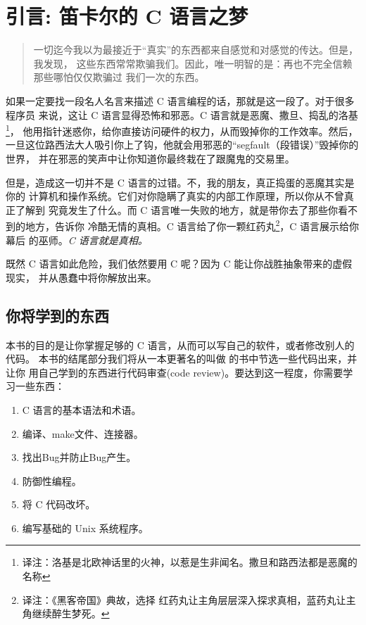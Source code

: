 \chapter*{引言: 笛卡尔的 C 语言之梦}

\begin{quotation}

一切迄今我以为最接近于“真实”的东西都来自感觉和对感觉的传达。但是，我发现，
这些东西常常欺骗我们。因此，唯一明智的是：再也不完全信赖那些哪怕仅仅欺骗过
我们一次的东西。

\end{quotation}

如果一定要找一段名人名言来描述 C 语言编程的话，那就是这一段了。对于很多程序员
来说，这让 C 语言显得恐怖和邪恶。C 语言就是恶魔、撒旦、捣乱的洛基\footnote{译注：洛基是北欧神话里的火神，以惹是生非闻名。撒旦和路西法都是恶魔的名称}，
他用指针迷惑你，给你直接访问硬件的权力，从而毁掉你的工作效率。然后，
一旦这位路西法大人吸引你上了钩，他就会用邪恶的“segfault（段错误）”毁掉你的世界，
并在邪恶的笑声中让你知道你最终栽在了跟魔鬼的交易里。

但是，造成这一切并不是 C 语言的过错。不，我的朋友，真正捣蛋的恶魔其实是你的
计算机和操作系统。它们对你隐瞒了真实的内部工作原理，所以你从不曾真正了解到
究竟发生了什么。而 C 语言唯一失败的地方，就是带你去了那些你看不到的地方，告诉你
冷酷无情的真相。C 语言给了你一颗红药丸\footnote{译注：《黑客帝国》典故，选择
红药丸让主角层层深入探求真相，蓝药丸让主角继续醉生梦死。}，C 语言展示给你幕后
的巫师。\emph{C 语言就是真相。}

既然 C 语言如此危险，我们依然要用 C 呢？因为 C 能让你战胜抽象带来的虚假现实，
并从愚蠢中将你解放出来。

\section*{你将学到的东西}

本书的目的是让你掌握足够的 C 语言，从而可以写自己的软件，或者修改别人的代码。
本书的结尾部分我们将从一本更著名的叫做 \krc 的书中节选一些代码出来，并让你
用自己学到的东西进行代码审查(code review)。要达到这一程度，你需要学习一些东西：

\begin{enumerate}
\item C 语言的基本语法和术语。
\item 编译、make文件、连接器。
\item 找出Bug并防止Bug产生。
\item 防御性编程。
\item 将 C 代码改坏。
\item 编写基础的 Unix 系统程序。
\end{enumerate}

